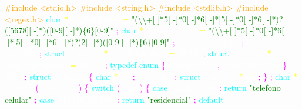 \justifying \small 

\textcolor{orange}{\#include <stdio.h>} 
\textcolor{orange}{\#include <string.h>} 
\textcolor{orange}{\#include <stdlib.h>} 
\textcolor{orange}{\#include <regex.h>} 
\textcolor{cyan}{char} 
\textcolor{yellow}{*} 
\textcolor{white}{expTelefonica} 
\textcolor{yellow}{=} 
\textcolor{green}{"(\textbackslash \textbackslash +[ ]*5[ -]*0[ -]*6[ -]*|5[ -]*0[ -]*6[ -]*)?([5678][ -]*)([0-9][ -]*)\{6\}[0-9]"} 
\textcolor{magenta}{;} 
\textcolor{cyan}{char} 
\textcolor{yellow}{*} 
\textcolor{white}{expResidencia} 
\textcolor{yellow}{=} 
\textcolor{green}{"(\textbackslash \textbackslash +[ ]*5[ -]*0[ -]*6[ -]*|5[ -]*0[ -]*6[ -]*)?(2[ -]*)([0-9][ -]*)\{6\}[0-9]"} 
\textcolor{magenta}{;} 
\textcolor{white}{regex\_t} 
\textcolor{white}{regexTel} 
\textcolor{magenta}{;} 
\textcolor{white}{regex\_t} 
\textcolor{white}{regexRes} 
\textcolor{magenta}{;} 
\textcolor{cyan}{struct} 
\textcolor{white}{Contacto} 
\textcolor{yellow}{*} 
\textcolor{white}{numTelefonicos} 
\textcolor{yellow}{=} 
\textcolor{white}{NULL} 
\textcolor{magenta}{;} 
\textcolor{cyan}{struct} 
\textcolor{white}{Contacto} 
\textcolor{yellow}{*} 
\textcolor{white}{numResidenciales} 
\textcolor{yellow}{=} 
\textcolor{white}{NULL} 
\textcolor{magenta}{;} 
\textcolor{cyan}{typedef} 
\textcolor{cyan}{enum} 
\textcolor{magenta}{\{} 
\textcolor{white}{TELEFONO} 
\textcolor{magenta}{,} 
\textcolor{white}{RESIDENCIAL} 
\textcolor{magenta}{\}} 
\textcolor{white}{Tipo} 
\textcolor{magenta}{;} 
\textcolor{cyan}{struct} 
\textcolor{white}{Contacto} 
\textcolor{magenta}{\{} 
\textcolor{cyan}{char} 
\textcolor{yellow}{*} 
\textcolor{white}{tel} 
\textcolor{magenta}{;} 
\textcolor{white}{Tipo} 
\textcolor{white}{tipo} 
\textcolor{magenta}{;} 
\textcolor{cyan}{struct} 
\textcolor{white}{Contacto} 
\textcolor{yellow}{*} 
\textcolor{white}{sig} 
\textcolor{magenta}{;} 
\textcolor{magenta}{\}} 
\textcolor{magenta}{;} 
\textcolor{cyan}{char} 
\textcolor{yellow}{*} 
\textcolor{white}{getTipo} 
\textcolor{magenta}{(} 
\textcolor{white}{Tipo} 
\textcolor{white}{tipo} 
\textcolor{magenta}{)} 
\textcolor{magenta}{\{} 
\textcolor{cyan}{switch} 
\textcolor{magenta}{(} 
\textcolor{white}{tipo} 
\textcolor{magenta}{)} 
\textcolor{magenta}{\{} 
\textcolor{cyan}{case} 
\textcolor{white}{TELEFONO} 
\textcolor{magenta}{:} 
\textcolor{cyan}{return} 
\textcolor{green}{"telefono celular"} 
\textcolor{magenta}{;} 
\textcolor{cyan}{case} 
\textcolor{white}{RESIDENCIAL} 
\textcolor{magenta}{:} 
\textcolor{cyan}{return} 
\textcolor{green}{"residencial"} 
\textcolor{magenta}{;} 
\textcolor{cyan}{default} 
